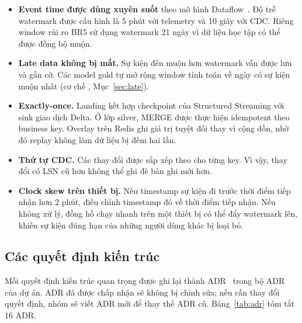 \begin{itemize}
  \item \textbf{Event time được dùng xuyên suốt} theo mô hình Dataflow~\cite{akidau2015dataflow}. Độ trễ watermark được cấu hình là 5 phút với telemetry và 10 giây với CDC. Riêng window rủi ro BR5 sử dụng watermark 21 ngày vì dữ liệu học tập có thể được đồng bộ muộn.
  \item \textbf{Late data không bị mất.} Sự kiện đến muộn hơn watermark vẫn được lưu và gắn cờ. Các model gold tự mở rộng window tính toán về ngày có sự kiện muộn nhất (cơ chế , Mục~\ref{sec:late}).
  \item \textbf{Exactly-once.} Landing kết hợp checkpoint của Structured Streaming với sink giao dịch Delta. Ở lớp silver, MERGE được thực hiện idempotent theo business key. Overlay trên Redis ghi giá trị tuyệt đối thay vì cộng dồn, nhờ đó replay không làm dữ liệu bị đếm hai lần.
  \item \textbf{Thứ tự CDC.} Các thay đổi được sắp xếp theo  cho từng key. Vì vậy, thay đổi có LSN cũ hơn không thể ghi đè bản ghi mới hơn.
  \item \textbf{Clock skew trên thiết bị.} Nếu timestamp sự kiện đi trước thời điểm tiếp nhận hơn 2 phút,  điều chỉnh timestamp đó về thời điểm tiếp nhận. Nếu không xử lý, đồng hồ chạy nhanh trên một thiết bị có thể đẩy watermark lên, khiến sự kiện đúng hạn của những người dùng khác bị loại bỏ.
\end{itemize}

\subsection{Các quyết định kiến trúc}

Mỗi quyết định kiến trúc quan trọng được ghi lại thành ADR~\cite{nygard2011adr} trong bộ ADR của dự án. ADR đã được chấp nhận sẽ không bị chỉnh sửa; nếu cần thay đổi quyết định, nhóm sẽ viết ADR mới để thay thế ADR cũ. Bảng~\ref{tab:adr} tóm tắt 16 ADR.

